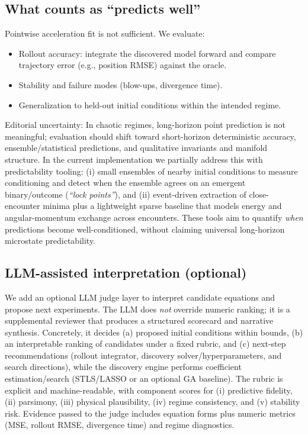 \documentclass[11pt]{article}
\begin{document}
\subsection{What counts as ``predicts well''}
Pointwise acceleration fit is not sufficient. We evaluate:
\begin{itemize}
\item Rollout accuracy: integrate the discovered model forward and compare trajectory error (e.g., position RMSE) against the oracle.
\item Stability and failure modes (blow-ups, divergence time).
\item Generalization to held-out initial conditions within the intended regime.
\end{itemize}

Editorial uncertainty: In chaotic regimes, long-horizon point prediction is not meaningful\cite{Lorenz1963}; evaluation should shift toward short-horizon deterministic accuracy, ensemble/statistical predictions, and qualitative invariants and manifold structure. In the current implementation we partially address this with predictability tooling: (i) small ensembles of nearby initial conditions to measure conditioning and detect when the ensemble agrees on an emergent binary/outcome (\emph{``lock points''}), and (ii) event-driven extraction of close-encounter minima plus a lightweight sparse baseline that models energy and angular-momentum exchange across encounters. These tools aim to quantify \emph{when} predictions become well-conditioned, without claiming universal long-horizon microstate predictability.

\subsection{LLM-assisted interpretation (optional)}
We add an optional LLM judge layer to interpret candidate equations and propose next experiments. The LLM does \emph{not} override numeric ranking; it is a supplemental reviewer that produces a structured scorecard and narrative synthesis. Concretely, it decides (a) proposed initial conditions within bounds, (b) an interpretable ranking of candidates under a fixed rubric, and (c) next-step recommendations (rollout integrator, discovery solver/hyperparameters, and search directions), while the discovery engine performs coefficient estimation/search (STLS/LASSO or an optional GA baseline). The rubric is explicit and machine-readable, with component scores for (i) predictive fidelity, (ii) parsimony, (iii) physical plausibility, (iv) regime consistency, and (v) stability risk. Evidence passed to the judge includes equation forms plus numeric metrics (MSE, rollout RMSE, divergence time) and regime diagnostics.
\end{document}
